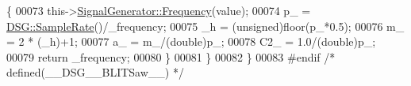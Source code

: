 \begin{DoxyCode}
      \{
00073             this->\hyperlink{class_d_s_g_1_1_signal_generator_a4e6b3c43e76e53f8cd337ad699c464cb}{SignalGenerator::Frequency}(value);
00074             p\_ = \hyperlink{namespace_d_s_g_a72df05177db0412c3590070923f62819}{DSG::SampleRate}()/\_frequency;
00075             \_h = (unsigned)floor(p\_*0.5);
00076             m\_ = 2 * (\_h)+1;
00077             a\_ = m\_/(double)p\_;
00078             C2\_ = 1.0/(double)p\_;
00079             \textcolor{keywordflow}{return} \_frequency;
00080         \}
00081     \}
00082 \}
00083 \textcolor{preprocessor}{#endif }\textcolor{comment}{/* defined(\_\_DSG\_\_BLITSaw\_\_) */}\textcolor{preprocessor}{}
\end{DoxyCode}
